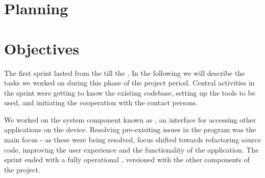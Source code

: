 
\section{Planning}

\section{Objectives}
The first sprint lasted from the  till the .
In the following we will describe the tasks we worked on during this phase of the project period. 
Central activities in the sprint were getting to know the existing codebase, setting up the tools to be used, and initiating the cooperation with the contact persons.

We worked on the system component known as \textit{\launcher}, an interface for accessing other \giraf applications on the device.
Resolving pre-exisiting issues in the program was the main focus - as these were being resolved, focus shifted towards refactoring source code, improving the user experience and the functionality of the application.
The sprint ended with a fully operational \launcher, versioned with the other components of the project.